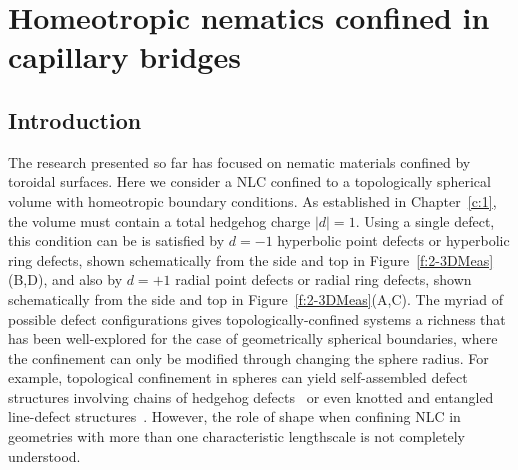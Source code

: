 \chapter{Homeotropic nematics confined in capillary bridges}

\section{Introduction}
The research presented so far has focused on nematic materials confined by toroidal surfaces.
Here we consider a NLC confined to a topologically spherical volume with homeotropic boundary conditions.
As established in Chapter~\ref{c:1}, the volume must contain a total hedgehog charge $|d| = 1$.
Using a single defect, this condition can be is satisfied by $d=-1$ hyperbolic point defects or hyperbolic ring defects, shown schematically from the side and top in Figure~\ref{f:2-3DMeas}(B,D), and also by $d=+1$ radial point defects or radial ring defects, shown schematically from the side and top in Figure~\ref{f:2-3DMeas}(A,C).
The myriad of possible defect configurations gives topologically-confined systems a richness that has been well-explored for the case of geometrically spherical boundaries, where the confinement can only be modified through changing the sphere radius.
For example, topological confinement in spheres can yield self-assembled defect structures involving chains of hedgehog defects~\cite{RN150} or even knotted and entangled line-defect structures~\cite{RN277,RN278,RN275,RN276}.
However, the role of shape when confining NLC in geometries with more than one characteristic lengthscale is not completely understood.

